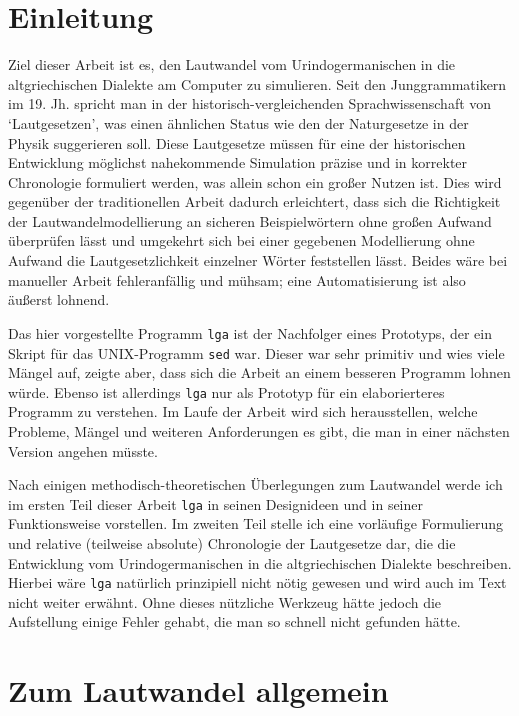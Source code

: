 \documentclass[12pt,a4paper,normalheadings]{scrartcl}
\def\tt#1{\texttt{#1}}
\begin{document}
\onehalfspacing

\section{Einleitung}

Ziel dieser Arbeit ist es,
den Lautwandel vom Urindogermanischen in die altgriechischen Dialekte
am Computer zu simulieren.
Seit den Junggrammatikern im 19. Jh. spricht man
in der historisch-vergleichenden Sprachwissenschaft von `Lautgesetzen',
was einen ähnlichen Status wie den der Naturgesetze in der Physik
suggerieren soll.
Diese Lautgesetze müssen für eine der historischen Entwicklung möglichst
nahekommende Simulation präzise und in korrekter Chronologie formuliert werden,
was allein schon ein großer Nutzen ist.
Dies wird gegenüber der traditionellen Arbeit dadurch erleichtert,
dass sich die Richtigkeit der Lautwandelmodellierung
an sicheren Beispielwörtern ohne großen Aufwand überprüfen lässt
und umgekehrt sich bei einer gegebenen Modellierung
ohne Aufwand die Lautgesetzlichkeit einzelner Wörter feststellen lässt.
Beides wäre bei manueller Arbeit fehleranfällig und mühsam;
eine Automatisierung ist also äußerst lohnend.

Das hier vorgestellte Programm \tt{lga} ist
der Nachfolger eines Prototyps,
der ein Skript für das UNIX-Programm \tt{sed} war.
Dieser war sehr primitiv und wies viele Mängel auf,
zeigte aber,
dass sich die Arbeit an einem besseren Programm lohnen würde.
Ebenso ist allerdings \tt{lga} nur als Prototyp
für ein elaborierteres Programm zu verstehen.
Im Laufe der Arbeit wird sich herausstellen,
welche Probleme, Mängel und weiteren Anforderungen es gibt,
die man in einer nächsten Version angehen müsste.

Nach einigen methodisch-theoretischen Überlegungen zum Lautwandel
werde ich im ersten Teil dieser Arbeit \tt{lga}
in seinen Designideen und in seiner Funktionsweise vorstellen.
Im zweiten Teil stelle ich eine vorläufige Formulierung und relative
(teilweise absolute) Chronologie der Lautgesetze dar,
die die Entwicklung vom Urindogermanischen in die altgriechischen Dialekte
beschreiben.
Hierbei wäre \tt{lga} natürlich prinzipiell nicht nötig gewesen
und wird auch im Text nicht weiter erwähnt.
Ohne dieses nützliche Werkzeug hätte jedoch
die Aufstellung einige Fehler gehabt,
die man so schnell nicht gefunden hätte.

\section{Zum Lautwandel allgemein}
\end{document}
